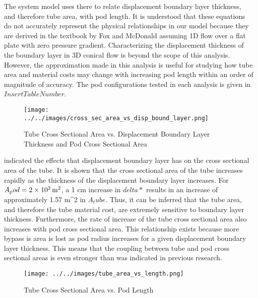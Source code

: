 The system model uses there to relate displacement boundary layer thickness, and therefore tube area, with pod length. It is understood that these equations do not accurately represent the physical relationships in our model because they are derived in the textbook by Fox and McDonald assuming 1D flow over a flat plate with zero pressure gradient. Characterizing the displacement thickness of the boundary layer in 3D conical flow is beyond the scope of this analysis. However, the approximation made in this analysis is useful for studying how tube area and material costs may change with increasing pod length within an order of magnitude of accuracy.  The pod configurations tested in each analysis is given in $Insert Table Number$.
\begin{table}
	\centering
	\caption{Configuratoins in boundary layer sensitivity study}
	\label{tbl:boundary_layer_sensitivty_configs}
\end{table}
\begin{figure}
	\centering
	\caption{Tube Cross Sectional Area vs. Displacement Boundary Layer Thickness and Pod Cross Sectional Area}
	\label{fig:cross_sec_area_vs_disp_boundary_layer}
	\texttt{[image: ../../images/cross\_sec\_area\_vs\_disp\_bound\_layer.png]}
\end{figure}
 indicated the effects that displacement boundary layer has on the cross sectional area of the tube. It is shown that the cross sectional area of the tube increases rapidly as the thickness of the displacement boundary layer increases. For $A_pod = \SI{2d2}{\m\squared}$, a 1 cm increase in $delta*$ results in an increase of approximately 1.57 m^2 in $A_tube$. Thus, it can be inferred that the tube area, and therefore the tube material cost, are extremely sensitive to boundary layer thickness. Furthermore, the rate of increase of the tube cross sectional area also increases with pod cross sectional area. This relationship exists because more bypass is area is lost as pod radius increases for a given displacement boundary layer thickness. This means that the coupling between tube and pod cross sectional areas is even stronger than was indicated in previous research. 
\begin{figure}
	\centering
	\caption{Tube Cross Sectional Area vs. Pod Length}
	\label{fig:tube_area_vs_length}
	\texttt{[image: ../../images/tube\_area\_vs\_length.png]}
\end{figure}
